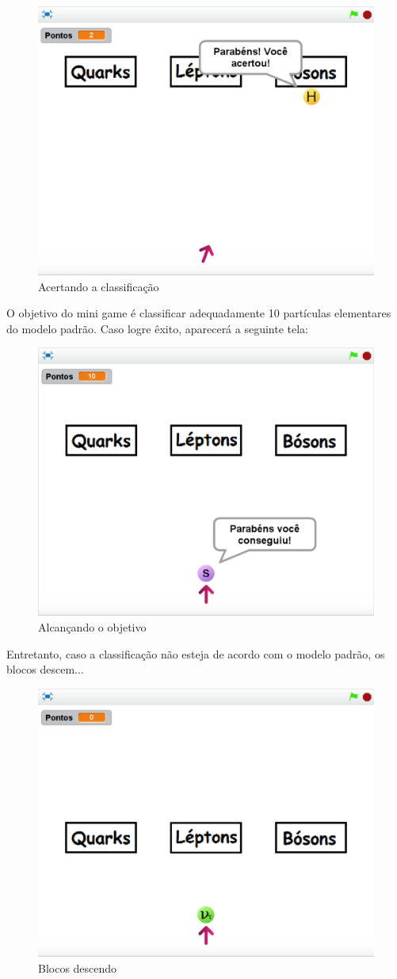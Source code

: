 \documentclass[12pt,fleqn]{book} %
\begin{document}
\begin{figure}[h]
	\centering
	\includegraphics[width=0.65 \textwidth]{Produto/class5}
	\caption{Acertando a classificação}
	\label{fig:app_a:class5}
\end{figure}


O objetivo do mini game é classificar adequadamente 10 partículas elementares do modelo padrão. Caso logre êxito, aparecerá a seguinte tela:

\begin{figure}[h]
	\centering
	\includegraphics[width=0.63 \textwidth]{Produto/class10}
	\caption{Alcançando o objetivo}
	\label{fig:app_a:class10}
\end{figure}

\newpage

Entretanto, caso a classificação não esteja de acordo com o modelo padrão, os blocos descem...

\begin{figure}[h]
	\centering
	\includegraphics[width=0.65 \textwidth]{Produto/class4}
	\caption{Blocos descendo}
	\label{fig:app_a:class4}
\end{figure}
\end{document}
